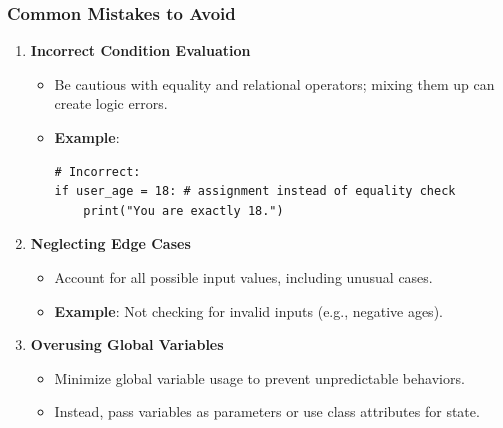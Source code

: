 \documentclass{beamer}
\begin{document}
\begin{frame}[fragile]
    \frametitle{Common Mistakes to Avoid}
    \begin{enumerate}
        \item \textbf{Incorrect Condition Evaluation}
        \begin{itemize}
            \item Be cautious with equality and relational operators; mixing them up can create logic errors.
            \item \textbf{Example}: 
            \begin{lstlisting}
# Incorrect: 
if user_age = 18: # assignment instead of equality check
    print("You are exactly 18.")
            \end{lstlisting}
        \end{itemize}

        \item \textbf{Neglecting Edge Cases}
        \begin{itemize}
            \item Account for all possible input values, including unusual cases.
            \item \textbf{Example}: Not checking for invalid inputs (e.g., negative ages).
        \end{itemize}

        \item \textbf{Overusing Global Variables}
        \begin{itemize}
            \item Minimize global variable usage to prevent unpredictable behaviors.
            \item Instead, pass variables as parameters or use class attributes for state.
        \end{itemize}
    \end{enumerate}
\end{frame}
\end{document}
